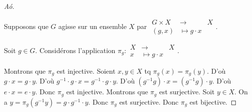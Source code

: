 \documentclass[french]{book}
\theoremstyle{definition}
\theoremstyle{remark}
\begin{document}
\begin{proof}[A\textpi\'o\textdelta\textepsilon\textiota\textxi\textiota]

  \









  Supposons que $G$ agisse sur un ensemble $X$ par $
    \begin{array}{rcl}
    G \times X & \longrightarrow & X \\
    (g,x) & \longmapsto g \cdot x
    \end{array}$.

  Soit $g \in G$. Considérons l'application $\pi_g:
    \begin{array}{rcl}
    X & \longrightarrow & X \\
    x & \longmapsto g \cdot x
    \end{array}$.

  Montrons que $\pi_g$ est injective. Soient $x, y \in X$ tq $\pi_g(x) = \pi_g(y)$. D'où $g \cdot x = g \cdot y$. D'où $g ^{-1}  \cdot g \cdot x = g ^{-1}  \cdot g \cdot y$. D'où $(g ^{-1}  g ) \cdot x = (g ^{-1}  g ) \cdot y$. D'où $e \cdot x = e \cdot y$. Donc $\pi_g$ est injective. Montrons que $\pi_g$ est surjective. Soit $y \in X$. On a $y = \pi_g(g ^{-1}  y) = g \cdot g ^{-1}  \cdot y$. Donc $\pi_g$ est surjective. Donc $\pi_g$ est bijective.


\end{proof}
\end{document}
